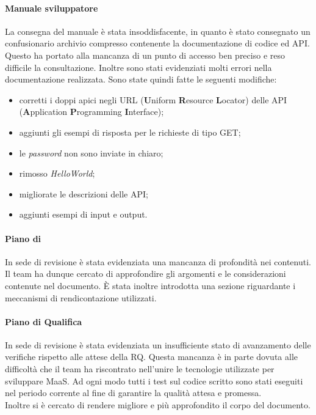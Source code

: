 \paragraph*{Manuale sviluppatore}
La consegna del manuale è stata insoddisfacente, in quanto è stato consegnato un confusionario archivio compresso contenente la documentazione di codice ed API. Questo ha portato alla mancanza di un punto di accesso ben preciso e reso difficile la consultazione. Inoltre sono stati evidenziati molti errori nella documentazione realizzata. Sono state quindi fatte le seguenti modifiche:
\begin{itemize}
\item corretti i doppi apici negli URL (\textbf{U}niform \textbf{R}esource \textbf{L}ocator) delle API (\textbf{A}pplication \textbf{P}rogramming \textbf{I}nterface);
\item aggiunti gli esempi di risposta per le richieste di tipo GET;
\item le \textit{password} non sono inviate in chiaro;
\item rimosso \textit{HelloWorld};
\item migliorate le descrizioni delle API;
\item aggiunti esempi di input e output.
\end{itemize}

\paragraph*{Piano di }
In sede di revisione è stata evidenziata una mancanza di profondità nei contenuti. Il team ha dunque cercato di approfondire gli argomenti e le considerazioni contenute nel documento. È stata inoltre introdotta una sezione riguardante i meccanismi di rendicontazione utilizzati.

\paragraph*{Piano di Qualifica}
In sede di revisione è stata evidenziata un insufficiente stato di avanzamento delle verifiche rispetto alle attese della RQ. Questa mancanza è in parte dovuta alle difficoltà che il team ha riscontrato nell'unire le tecnologie utilizzate per sviluppare MaaS. Ad ogni modo tutti i test sul codice scritto sono stati eseguiti nel periodo corrente al fine di garantire la qualità attesa e promessa. \\
Inoltre si è cercato di rendere migliore e più approfondito il corpo del documento.
